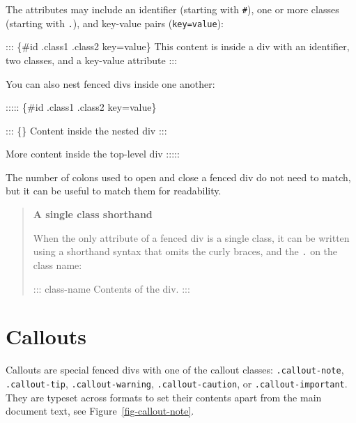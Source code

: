 \documentclass[
  letterpaper,
  DIV=11,
  numbers=noendperiod,
  oneside]{scrreprt}
\newenvironment{Shaded}{\begin{snugshade}}{\end{snugshade}}
\newcommand{\NormalTok}[1]{\textcolor[rgb]{0.00,0.23,0.31}{#1}}
\begin{document}
\begin{tcolorbox}
The attributes may include an identifier (starting with \texttt{\#}),
one or more classes (starting with \texttt{.}), and key-value pairs
(\texttt{key=\textquotesingle{}value\textquotesingle{}}):

\begin{Shaded}
\begin{Highlighting}[]
\NormalTok{::: \{\#id .class1 .class2 key=\textquotesingle{}value\textquotesingle{}\}}
\NormalTok{This content is inside a div with an identifier, two classes, and a key{-}value attribute}
\NormalTok{:::}
\end{Highlighting}
\end{Shaded}

You can also nest fenced divs inside one another:

\begin{Shaded}
\begin{Highlighting}[]
\NormalTok{::::: \{\#id .class1 .class2 key=\textquotesingle{}value\textquotesingle{}\}}

\NormalTok{::: \{\}}
\NormalTok{Content inside the nested div}
\NormalTok{:::}

\NormalTok{More content inside the top{-}level div}
\NormalTok{:::::}
\end{Highlighting}
\end{Shaded}

The number of colons used to open and close a fenced div do not need to
match, but it can be useful to match them for readability.

\begin{quote}
\textbf{A single class shorthand}

When the only attribute of a fenced div is a single class, it can be
written using a shorthand syntax that omits the curly braces, and the
\texttt{.} on the class name:

\begin{Shaded}
\begin{Highlighting}[]
\NormalTok{::: class{-}name}
\NormalTok{Contents of the div.}
\NormalTok{:::}
\end{Highlighting}
\end{Shaded}
\end{quote}

\section{Callouts}\label{sec-callouts}

Callouts are special fenced divs with one of the callout classes:
\texttt{.callout-note}, \texttt{.callout-tip},
\texttt{.callout-warning}, \texttt{.callout-caution}, or
\texttt{.callout-important}. They are typeset across formats to set
their contents apart from the main document text, see
Figure~\ref{fig-callout-note}.


\end{tcolorbox}
\end{document}
